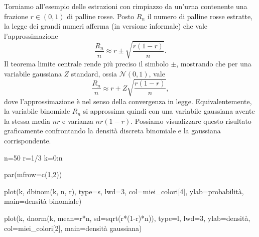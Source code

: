 \documentclass[
  italian,
  letterpaper,
]{book}
\newenvironment{Shaded}{\begin{snugshade}}{\end{snugshade}}
\newcommand{\AttributeTok}[1]{\textcolor[rgb]{0.40,0.45,0.13}{#1}}
\newcommand{\DecValTok}[1]{\textcolor[rgb]{0.68,0.00,0.00}{#1}}
\newcommand{\FunctionTok}[1]{\textcolor[rgb]{0.28,0.35,0.67}{#1}}
\newcommand{\NormalTok}[1]{\textcolor[rgb]{0.00,0.23,0.31}{#1}}
\newcommand{\OtherTok}[1]{\textcolor[rgb]{0.00,0.23,0.31}{#1}}
\newcommand{\SpecialCharTok}[1]{\textcolor[rgb]{0.37,0.37,0.37}{#1}}
\newcommand{\StringTok}[1]{\textcolor[rgb]{0.13,0.47,0.30}{#1}}
\theoremstyle{definition}
\theoremstyle{remark}
\begin{document}
Torniamo all'esempio delle estrazioni con rimpiazzo da un'urna
contenente una frazione \(r \in (0,1)\) di palline rosse. Posto \(R_n\)
il numero di palline rosse estratte, la legge dei grandi numeri afferma
(in versione informale) che vale l'approssimazione
\[ \frac{R_n}{n} \approx r \pm \sqrt{ \frac{ r(1-r) }{n}}.\] Il teorema
limite centrale rende più preciso il simbolo \(\pm\), mostrando che per
una variabile gaussiana \(Z\) standard, ossia \(\mathcal{N}(0,1)\), vale
\[ \frac{R_n}{n} \approx r + Z \sqrt{ \frac{ r(1-r) }{n}},\] dove
l'approssimazione è nel senso della convergenza in legge.
Equivalentemente, la variabile binomiale \(R_n\) si approssima quindi
con una variabile gaussiana avente la stessa media \(nr\) e varianza
\(n r(1-r)\). Possiamo visualizzare questo risultato graficamente
confrontando la densità discreta binomiale e la gaussiana
corrispondente.

\begin{Shaded}
\begin{Highlighting}[]
\NormalTok{n}\OtherTok{=}\DecValTok{50}
\NormalTok{r}\OtherTok{=}\DecValTok{1}\SpecialCharTok{/}\DecValTok{3}
\NormalTok{k}\OtherTok{=}\DecValTok{0}\SpecialCharTok{:}\NormalTok{n}

\FunctionTok{par}\NormalTok{(}\AttributeTok{mfrow=}\FunctionTok{c}\NormalTok{(}\DecValTok{1}\NormalTok{,}\DecValTok{2}\NormalTok{))}

\FunctionTok{plot}\NormalTok{(k, }\FunctionTok{dbinom}\NormalTok{(k, n, r), }\AttributeTok{type=}\StringTok{\textquotesingle{}s\textquotesingle{}}\NormalTok{, }\AttributeTok{lwd=}\DecValTok{3}\NormalTok{, }\AttributeTok{col=}\NormalTok{miei\_colori[}\DecValTok{4}\NormalTok{], }\AttributeTok{ylab=}\StringTok{\textquotesingle{}probabilità\textquotesingle{}}\NormalTok{, }\AttributeTok{main=}\StringTok{\textquotesingle{}densità binomiale\textquotesingle{}}\NormalTok{)}

\FunctionTok{plot}\NormalTok{(k, }\FunctionTok{dnorm}\NormalTok{(k, }\AttributeTok{mean=}\NormalTok{r}\SpecialCharTok{*}\NormalTok{n, }\AttributeTok{sd=}\FunctionTok{sqrt}\NormalTok{(r}\SpecialCharTok{*}\NormalTok{(}\DecValTok{1}\SpecialCharTok{{-}}\NormalTok{r)}\SpecialCharTok{*}\NormalTok{n)), }\AttributeTok{type=}\StringTok{\textquotesingle{}l\textquotesingle{}}\NormalTok{, }\AttributeTok{lwd=}\DecValTok{3}\NormalTok{, }\AttributeTok{ylab=}\StringTok{\textquotesingle{}densità\textquotesingle{}}\NormalTok{, }\AttributeTok{col=}\NormalTok{miei\_colori[}\DecValTok{2}\NormalTok{], }\AttributeTok{main=}\StringTok{\textquotesingle{}densità gaussiana\textquotesingle{}}\NormalTok{)}
\end{Highlighting}
\end{Shaded}
\end{document}
